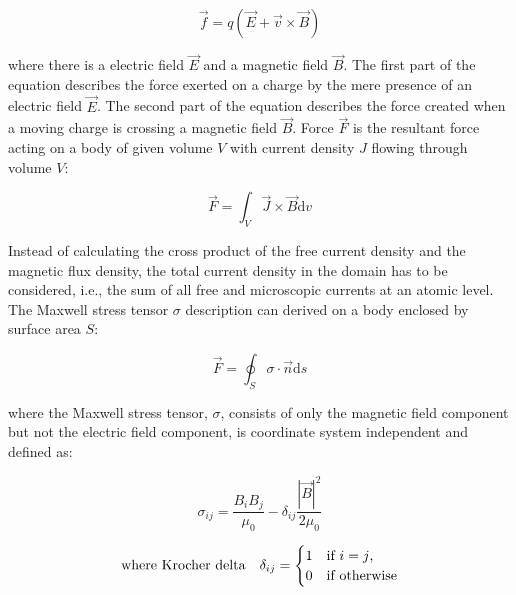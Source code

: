         
        \begin{equation}
            \overrightarrow{f} = q(\overrightarrow{E} + \overrightarrow{v} \times \overrightarrow{B})
            \label{eq:lorentz force equation}
        \end{equation}   
        
        
        where there is a electric field $\overrightarrow{E}$ and a magnetic field $\overrightarrow{B}$. The first part of the equation describes the force exerted on a charge by the mere presence of an electric field $\overrightarrow{E}$. The second part of the equation describes the force created when a moving charge is crossing a magnetic field $\overrightarrow{B}$. Force $\overrightarrow{F}$ is the resultant force acting on a body of given volume $V$ with current density $J$ flowing through volume $V$:
        
      
        \begin{equation}
            \overrightarrow{F} = \int_V \overrightarrow{J} \times \overrightarrow{B} \mathrm{d}v
            \label{eq:volume generalized lorentz}
        \end{equation} 
        
        
        Instead of calculating the cross product of the free current density and the magnetic flux density, the total current density in the domain has to be considered, i.e., the sum of all free and microscopic currents at an atomic level. The Maxwell stress tensor $\sigma$ description can derived on a body enclosed by surface area $S$:
        
        
        \begin{equation}
            \overrightarrow{F} = \oint_{S} \sigma \cdot \overrightarrow{n} \mathrm{d}s
            \label{eq:surface generalized lorentz}
        \end{equation}     


        where the Maxwell stress tensor, $\sigma$, consists of only the magnetic field component but not the electric field component, is coordinate system independent and defined as:


        \begin{equation}
            \label{eq:maxwell stress tensor}
            \sigma_{ij} = \frac{B_i B_j}{\mu_0} - \delta_{ij} \frac{| \overrightarrow{B} |^{2}}{2\mu_0}
        \end{equation}
                
        \begin{equation}
            \notag
            \begin{split}
                \text{where Krocher delta} \quad \delta_{ij} =
                    \begin{cases}
                        1       & \text{if $i=j$,}\\
                        0       & \text{if otherwise}
                    \end{cases}
            \end{split}
        \end{equation}
        

